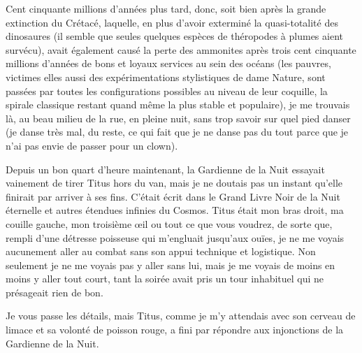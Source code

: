 Cent cinquante millions d’années plus tard, donc, soit bien après la grande extinction du Crétacé, laquelle, en plus d’avoir exterminé la quasi-totalité des dinosaures (il semble que seules quelques espèces de théropodes à plumes aient survécu), avait également causé la perte des ammonites après trois cent cinquante millions d’années de bons et loyaux services au sein des océans (les pauvres, victimes elles aussi des expérimentations stylistiques de dame Nature, sont passées par toutes les configurations possibles au niveau de leur coquille, la spirale classique restant quand même la plus stable et populaire), je me trouvais là, au beau milieu de la rue, en pleine nuit, sans trop savoir sur quel pied danser (je danse très mal, du reste, ce qui fait que je ne danse pas du tout parce que je n’ai pas envie de passer pour un clown).

Depuis un bon quart d’heure maintenant, la Gardienne de la Nuit essayait vainement de tirer Titus hors du van, mais je ne doutais pas un instant qu’elle finirait par arriver à ses fins. C’était écrit dans le Grand Livre Noir de la Nuit éternelle et autres étendues infinies du Cosmos. Titus était mon bras droit, ma couille gauche, mon troisième œil ou tout ce que vous voudrez, de sorte que, rempli d’une détresse poisseuse qui m’engluait jusqu’aux ouïes, je ne me voyais aucunement aller au combat sans son appui technique et logistique. Non seulement je ne me voyais pas y aller sans lui, mais je me voyais de moins en moins y aller tout court, tant la soirée avait pris un tour inhabituel qui ne présageait rien de bon.

Je vous passe les détails, mais Titus, comme je m’y attendais avec son cerveau de limace et sa volonté de poisson rouge, a fini par répondre aux injonctions de la Gardienne de la Nuit.

%

